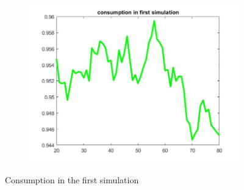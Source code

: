 \documentclass[12pt,a4paper]{article}
\begin{document}
\begin{figure}[h!]
\begin{subfigure}[b]{0.32\linewidth}
  \end{subfigure}
  \begin{subfigure}[b]{0.32\linewidth}
    \includegraphics[width=\linewidth]{graphs/Q2/cons3.jpg}
  \end{subfigure}
  \caption{Consumption in the first simulation}
    \label{fig:1}
\end{figure}
\end{document}
